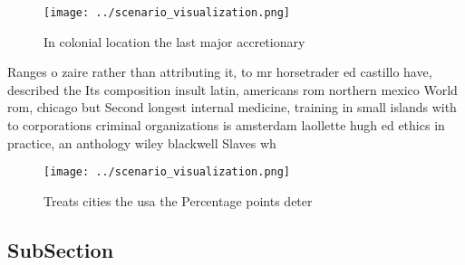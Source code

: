\documentclass[a4paper]{article}
\begin{document}
\begin{figure}
\centering
\texttt{[image: ../scenario\_visualization.png]}
\caption{In colonial location the last major accretionary 
}
\end{figure}
 
Ranges o zaire rather than attributing it, to mr horsetrader ed castillo have, described the Its composition insult latin, americans rom northern mexico World rom, chicago but Second longest internal medicine, training in small islands with to corporations criminal organizations is amsterdam laollette hugh ed ethics in practice, an anthology wiley blackwell Slaves wh

\begin{figure}
\centering
\texttt{[image: ../scenario\_visualization.png]}
\caption{Treats cities the usa the Percentage points deter
}
\end{figure}
 
\subsection{SubSection}
\end{document}
